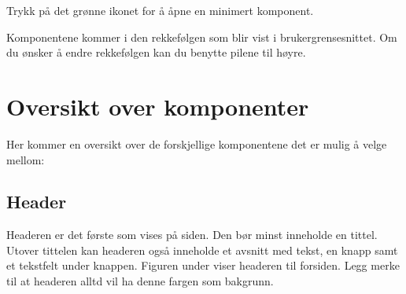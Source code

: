 Trykk på det grønne ikonet for å åpne en minimert komponent.

\begin{figure}[H]
    \centering
    \label{fig:cms-open}
\end{figure}

Komponentene kommer i den rekkefølgen som blir vist i brukergrensesnittet. Om du ønsker å endre rekkefølgen kan du benytte pilene til høyre. 
\begin{figure}[H]
    \centering
    \label{fig:cms-up-down}
\end{figure}

\section{Oversikt over komponenter}
Her kommer en oversikt over de forskjellige komponentene det er mulig å velge mellom:

\subsection{Header}
Headeren er det første som vises på siden. Den bør minst inneholde en tittel. Utover tittelen kan headeren også inneholde et avsnitt med tekst, en knapp samt et tekstfelt under knappen. Figuren under viser headeren til forsiden. Legg merke til at headeren alltd vil ha denne fargen som bakgrunn.

